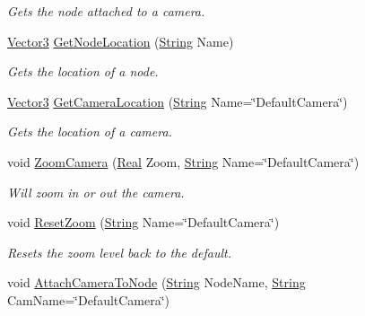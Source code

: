 \begin{DoxyCompactItemize}
\begin{DoxyCompactList}\small\item\em Gets the node attached to a camera. \item\end{DoxyCompactList}\item 
\hyperlink{classphys_1_1Vector3}{Vector3} \hyperlink{classphys_1_1CameraManager_af5fcec9bebd90b8e98b0d2f4def97ea1}{GetNodeLocation} (\hyperlink{namespacephys_aa03900411993de7fbfec4789bc1d392e}{String} Name)
\begin{DoxyCompactList}\small\item\em Gets the location of a node. \item\end{DoxyCompactList}\item 
\hyperlink{classphys_1_1Vector3}{Vector3} \hyperlink{classphys_1_1CameraManager_a3c94c0f970996981c3a24d0fed79d32c}{GetCameraLocation} (\hyperlink{namespacephys_aa03900411993de7fbfec4789bc1d392e}{String} Name=\char`\"{}DefaultCamera\char`\"{})
\begin{DoxyCompactList}\small\item\em Gets the location of a camera. \item\end{DoxyCompactList}\item 
void \hyperlink{classphys_1_1CameraManager_aa5a37dbdd45a53bc3dfd4cfa0a94bd42}{ZoomCamera} (\hyperlink{namespacephys_af7eb897198d265b8e868f45240230d5f}{Real} Zoom, \hyperlink{namespacephys_aa03900411993de7fbfec4789bc1d392e}{String} Name=\char`\"{}DefaultCamera\char`\"{})
\begin{DoxyCompactList}\small\item\em Will zoom in or out the camera. \item\end{DoxyCompactList}\item 
void \hyperlink{classphys_1_1CameraManager_a1cfaf4720fa9af7c0f234d6a2f26e179}{ResetZoom} (\hyperlink{namespacephys_aa03900411993de7fbfec4789bc1d392e}{String} Name=\char`\"{}DefaultCamera\char`\"{})
\begin{DoxyCompactList}\small\item\em Resets the zoom level back to the default. \item\end{DoxyCompactList}\item 
void \hyperlink{classphys_1_1CameraManager_a1cde365b6cab80a33ddf7046489f7af9}{AttachCameraToNode} (\hyperlink{namespacephys_aa03900411993de7fbfec4789bc1d392e}{String} NodeName, \hyperlink{namespacephys_aa03900411993de7fbfec4789bc1d392e}{String} CamName=\char`\"{}DefaultCamera\char`\"{})

\end{DoxyCompactItemize}
